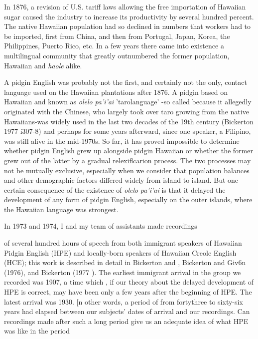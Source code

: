 In 1876, a revision of U.S. tariff laws allowing the free importa\-tion of Hawaiian sugar caused the industry to increase its productivity by several hundred percent. The native Hawaiian population had so declined in numbers that workers had to be imported, first from China, and then from Portugal, Japan, Korea, the Philippines, Puerto Rico, etc. In a few years there came into existence a multilingual community that greatly outnumbered the former population, Hawaiian and \textit{haole} alike.

A pidgin English was probably not the first, and certainly not the only, contact language used on the Hawaiian plantations after 1876. A pidgin based on Hawaiian and known as \textit{olelo} \textit{pa'i'ai }'taro\-language' {}-so called because it allegedly originated with the Chinese, who largely took over taro growing from the native Hawaiians-was widely used in the last two decades of the 19th century (Bickerton 1977 i307-8) and perhaps for some years afterward, since one speaker, a Filipino, was still alive in the mid-1970s. So far, it has proved impos\-sible to determine whether pidgin English grew up alongside pidgin Hawaiian or whether the former grew out of the latter by a gradual relexiflcarion process. The two processes may not be mutually exclu\-sive, especially when we consider that population balances and other demographic factors differed widely from island to island. But one certain consequence of the existence of \textit{olelo} \textit{pa'i'ai} is that it delayed the development of any form of pidgin English, especially on the outer islands, where the Hawaiian language was strongest.

In 1973 and 1974, I and my team of assistants made recordings


of several hundred hours of speech from both immigrant speakers of Hawaiian Pidgin English (HPE) and locally-born speakers of Hawaiian Creole English (HCE); this work is described in detail in Bickerton and \citet{Odo1976}, Bickerton and Giv6n (1976), and Bickerton (1977 ). The earliest immigrant arrival in the group we recorded was 1907, a time which , if our theory about the delayed development of HPE is correct, may have been only a few years after the beginning of HPE. The latest arrival was 1930. [n other words, a period of from forty\-three to sixty-six years had elapsed between our subjects' dates of arrival and our recordings. Can recordings made after such a long period give us an adequate idea of what HPE was like in the period

